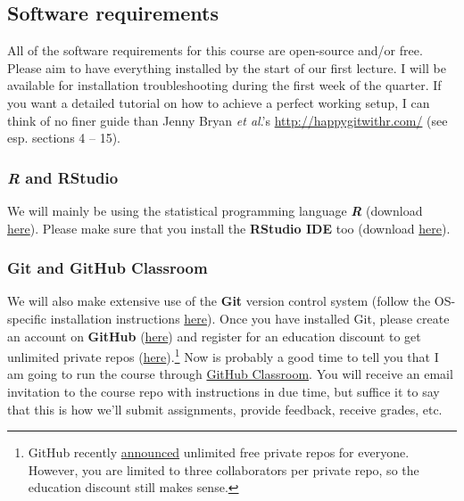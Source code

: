 \documentclass[12]{article}
\begin{document}
\subsection*{Software requirements}

All of the software requirements for this course are open-source and/or free. Please aim to have everything installed by the start of our first lecture. I will be available for installation troubleshooting during the first week of the quarter. If you want a detailed tutorial on how to achieve a perfect working setup, I can think of no finer guide than Jenny Bryan \textit{et al}.'s \url{http://happygitwithr.com/} (see esp. sections 4 -- 15).

\vspace{-0.25cm}
\subsubsection*{\textit{R} and RStudio}

We will mainly be using the statistical programming language \textbf{\textit{R}} (download \href{https://www.r-project.org/}{here}). %
Please make sure that you install the \textbf{RStudio IDE} too (download \href{https://www.rstudio.com/products/rstudio/download/preview/}{here}).

\vspace{-0.25cm}
\subsubsection*{Git and GitHub Classroom}

We will also make extensive use of the \textbf{Git} version control system (follow the OS-specific installation instructions \href{http://happygitwithr.com/install-git.html}{here}). Once you have installed Git, please create an account on \textbf{GitHub} (\href{https://github.com/join}{here}) and register for an education discount to get unlimited private repos (\href{https://education.github.com/discount_requests/new}{here}).\footnote{GitHub recently \href{https://blog.github.com/changelog/2019-01-08-pricing-changes/}{announced} unlimited free private repos for everyone. However, you are limited to three collaborators per private repo, so the education discount still makes sense.} Now is probably a good time to tell you that I am going to run the course through \href{https://classroom.github.com/}{GitHub Classroom}. You will receive an email invitation to the course repo with instructions in due time, but suffice it to say that this is how we'll submit assignments, provide feedback, receive grades, etc.
\end{document}
